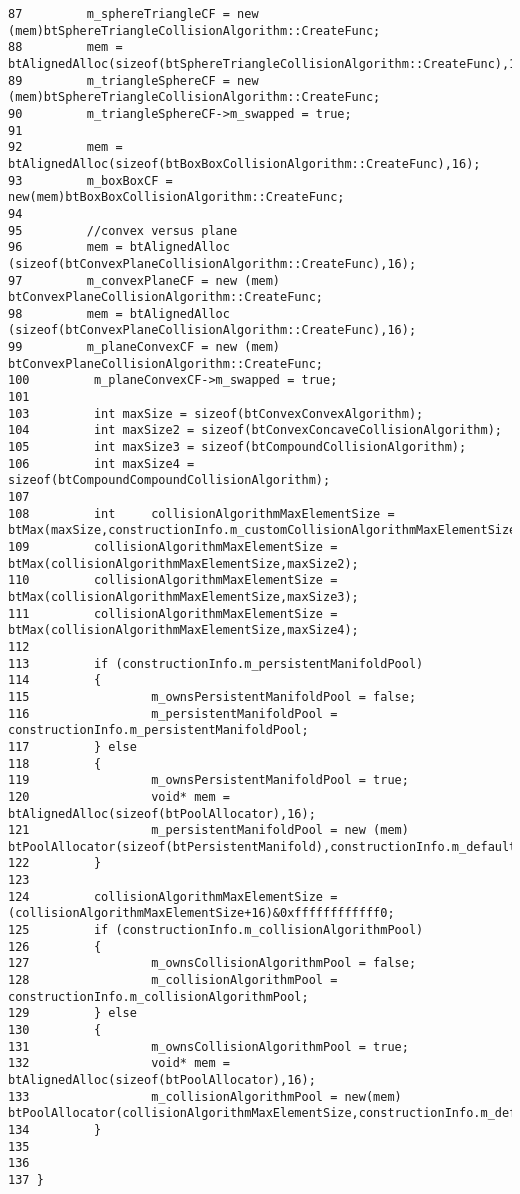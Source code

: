 \begin{Code}
\begin{verbatim}
87         m_sphereTriangleCF = new (mem)btSphereTriangleCollisionAlgorithm::CreateFunc;
88         mem = btAlignedAlloc(sizeof(btSphereTriangleCollisionAlgorithm::CreateFunc),16);
89         m_triangleSphereCF = new (mem)btSphereTriangleCollisionAlgorithm::CreateFunc;
90         m_triangleSphereCF->m_swapped = true;
91         
92         mem = btAlignedAlloc(sizeof(btBoxBoxCollisionAlgorithm::CreateFunc),16);
93         m_boxBoxCF = new(mem)btBoxBoxCollisionAlgorithm::CreateFunc;
94 
95         //convex versus plane
96         mem = btAlignedAlloc (sizeof(btConvexPlaneCollisionAlgorithm::CreateFunc),16);
97         m_convexPlaneCF = new (mem) btConvexPlaneCollisionAlgorithm::CreateFunc;
98         mem = btAlignedAlloc (sizeof(btConvexPlaneCollisionAlgorithm::CreateFunc),16);
99         m_planeConvexCF = new (mem) btConvexPlaneCollisionAlgorithm::CreateFunc;
100         m_planeConvexCF->m_swapped = true;
101         
103         int maxSize = sizeof(btConvexConvexAlgorithm);
104         int maxSize2 = sizeof(btConvexConcaveCollisionAlgorithm);
105         int maxSize3 = sizeof(btCompoundCollisionAlgorithm);
106         int maxSize4 = sizeof(btCompoundCompoundCollisionAlgorithm);
107 
108         int     collisionAlgorithmMaxElementSize = btMax(maxSize,constructionInfo.m_customCollisionAlgorithmMaxElementSize);
109         collisionAlgorithmMaxElementSize = btMax(collisionAlgorithmMaxElementSize,maxSize2);
110         collisionAlgorithmMaxElementSize = btMax(collisionAlgorithmMaxElementSize,maxSize3);
111         collisionAlgorithmMaxElementSize = btMax(collisionAlgorithmMaxElementSize,maxSize4);
112                 
113         if (constructionInfo.m_persistentManifoldPool)
114         {
115                 m_ownsPersistentManifoldPool = false;
116                 m_persistentManifoldPool = constructionInfo.m_persistentManifoldPool;
117         } else
118         {
119                 m_ownsPersistentManifoldPool = true;
120                 void* mem = btAlignedAlloc(sizeof(btPoolAllocator),16);
121                 m_persistentManifoldPool = new (mem) btPoolAllocator(sizeof(btPersistentManifold),constructionInfo.m_defaultMaxPersistentManifoldPoolSize);
122         }
123         
124         collisionAlgorithmMaxElementSize = (collisionAlgorithmMaxElementSize+16)&0xffffffffffff0;
125         if (constructionInfo.m_collisionAlgorithmPool)
126         {
127                 m_ownsCollisionAlgorithmPool = false;
128                 m_collisionAlgorithmPool = constructionInfo.m_collisionAlgorithmPool;
129         } else
130         {
131                 m_ownsCollisionAlgorithmPool = true;
132                 void* mem = btAlignedAlloc(sizeof(btPoolAllocator),16);
133                 m_collisionAlgorithmPool = new(mem) btPoolAllocator(collisionAlgorithmMaxElementSize,constructionInfo.m_defaultMaxCollisionAlgorithmPoolSize);
134         }
135 
136 
137 }
\end{verbatim}
\end{Code}




